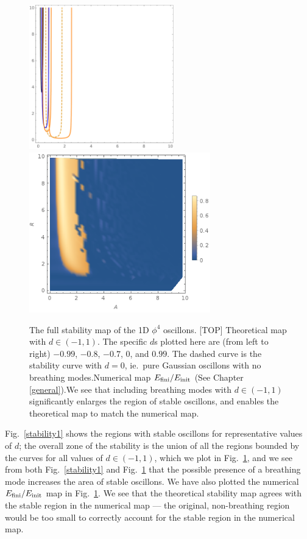 \documentclass[11pt]{book}
\begin{document}
\begin{figure}\centering
  \hskip-20pt\includegraphics[width=0.56\textwidth]{plot/full-phi4-theory.pdf}\\\vskip12pt
  \includegraphics[width=0.7\textwidth]{plot/energy-ratio-phi4-1d.png}
  \caption{The full stability map of the 1D $\phi^4$ oscillons. [TOP] Theoretical map with $d\in(-1,1)$. The specific $d$s plotted here are (from left to right) $-0.99$, $-0.8$, $-0.7$, $0$, and $0.99$. The dashed curve is the stability curve with $d=0$, ie.~pure Gaussian oscillons with no breathing modes.\quad [DOWN] Numerical map $E_{\rm fini}/E_{\rm init}$ (See Chapter \ref{general}).\qquad We see that including breathing modes with $d\in(-1,1)$ significantly enlarges the region of stable oscillons, and enables the theoretical map to match the numerical map.}\label{stabilityfull}
\end{figure}

Fig.~\ref{stability1} shows the regions with stable oscillons for representative values of $d$; the overall zone of the stability is the union of all the regions bounded by the curves for all values of $d\in(-1,1)$, which we plot in Fig.~\ref{stabilityfull}, and we see from both Fig.~\ref{stability1} and Fig.~\ref{stabilityfull} that the possible presence of a breathing mode increases the area of stable oscillons. We have also plotted the numerical $E_{\rm fini}/E_{\rm init}$ map in Fig.~\ref{stabilityfull}. We see that the theoretical stability map agrees with the stable region in the numerical map --- the original, non-breathing region would be too small to correctly account for the stable region in the numerical map.
\end{document}
